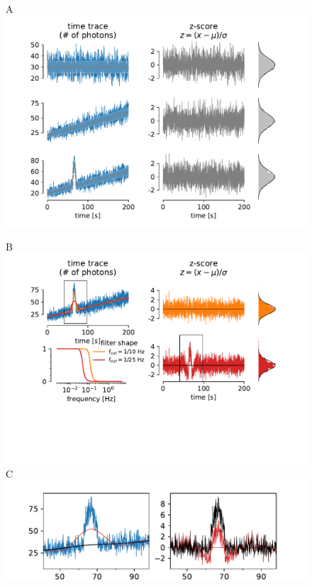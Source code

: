 \documentclass[a4paper,11pt,oneside]{article}
\begin{document}
\begin{figure}[t]
    \centering
    \begin{minipage}{.49\textwidth}
        {\selectfont A} \includegraphics[scale=.5,trim=15mm 0 0 0,clip,align=t]{figures/z_score_1.pdf}
    \end{minipage}
    \begin{minipage}{.49\textwidth} 
        {\selectfont B} \includegraphics[scale=.5,trim=15mm 30mm 0 0,clip,align=t]{figures/z_score_2.pdf}
        {\selectfont C} \includegraphics[scale=.48,trim=5mm 0mm 0 0,clip,align=t]{figures/z_score_3.pdf}

\end{minipage}
\end{figure}
\end{document}
